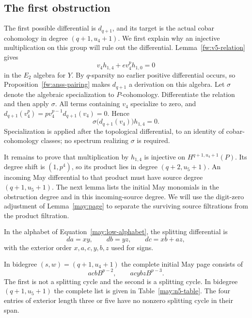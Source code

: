 \subsection{The first obstruction}

The first possible differential is $d_{q+1}$, and its target is the
actual cobar cohomology in degree $(q+1,u_4+1)$. We first explain why
an injective multiplication on this group will rule out the differential.
Lemma~\ref{fw:v5-relation} gives
\[
 v_4h_{1,4}+e v_4^p h_{1,0}=0
\]
in the $E_2$ algebra for $Y$. By $q$-sparsity no earlier positive
differential occurs, so Proposition~\ref{fw:anss-pairing} makes
$d_{q+1}$ a derivation on this algebra. Let $\sigma$ denote the
algebraic specialization to $P$-cohomology. Differentiate the relation
and then apply $\sigma$. All terms containing $v_4$ specialize to zero,
and $d_{q+1}(v_4^p)=p v_4^{p-1}d_{q+1}(v_4)=0$. Hence
\begin{equation}
 \sigma\bigl(d_{q+1}(v_4)\bigr)h_{1,4}=0.
 \label{may:specialized-obstruction}
\end{equation}
Specialization is applied after the topological differential, to an
identity of cobar-cohomology classes; no spectrum realizing $\sigma$
is required.

It remains to prove that multiplication by $h_{1,4}$ is injective on
$H^{q+1,u_4+1}(P)$. Its degree shift is $(1,p^4)$, so its product
lies in degree $(q+2,u_5+1)$. An incoming May differential to that
product must have source degree $(q+1,u_5+1)$. The next lemma lists
the initial May monomials in the obstruction degree and in this
incoming-source degree.
We will use the digit-zero adjustment of Lemma~\ref{may:page} to
separate the surviving source filtrations from the product filtration.

In the alphabet of Equation~\eqref{may:low-alphabet}, the splitting
differential is
\begin{equation}
 da=xy,\qquad db=yz,\qquad dc=xb+az,
 \label{may:small-splitting}
\end{equation}
with the exterior order $x,a,c,y,b,z$ used for signs.

\begin{lemma}
\label{may:first-list}
In bidegree $(s,w)=(q+1,u_4+1)$ the complete initial May page consists of
\begin{equation}
 acb B^{p-2},\qquad acybz B^{p-3}.
 \label{may:first-target-list}
\end{equation}
The first is not a splitting cycle and the second is a splitting cycle.
In bidegree $(q+1,u_5+1)$ the complete list is given in
Table~\ref{may:n5-table}.  The four entries of exterior length three or
five have no nonzero splitting cycle in their span.
\end{lemma}

